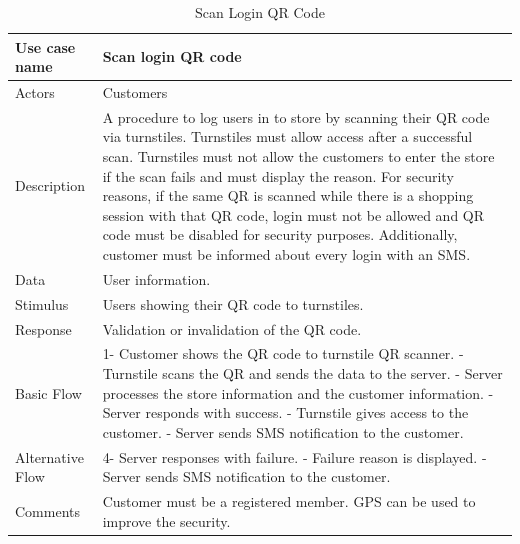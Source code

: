 \documentclass[11pt]{article}
\begin{document}
        

        \begin{table}[H]
        \begin{centering}
        \begin{tabular}{|p{2.5cm}|p{12cm}|}
        \hline
        Use case name & Scan login QR code \\ \hline
        Actors        & Customers \\ \hline
        Description   & A procedure to log users in to store by scanning their QR code via turnstiles. Turnstiles must allow access after a successful scan. Turnstiles must not allow the customers to enter the store if the scan fails and must display the reason. For security reasons, if the same QR is scanned while there is a shopping session with that QR code, login must not be allowed and QR code must be disabled for security purposes. Additionally, customer must be informed about every login with an SMS.    \\  \hline
        Data          & User information. \\ \hline
        Stimulus      & Users showing their QR code to turnstiles. \\ \hline
        Response      & Validation or invalidation of the QR code.  \\ \hline
        Basic Flow    &
        1- Customer shows the QR code to turnstile QR scanner. \newline
        2- Turnstile scans the QR and sends the data to the server. \newline
        3- Server processes the store information and the customer information. \newline
        4- Server responds with success. \newline
        5- Turnstile gives access to the customer. \newline
        6- Server sends SMS notification to the customer. \\ \hline
        Alternative
            Flow      & 
        4- Server responses with failure. \newline
        5- Failure reason is displayed. \newline
        6- Server sends SMS notification to the customer. \\ \hline
        Comments      & Customer must be a registered member. GPS can be used to improve the security.\\ \hline
        
        \end{tabular}
        \caption{Scan Login QR Code}
        \label{tab}
        \end{centering}
        \end{table}    
        
\end{document}
